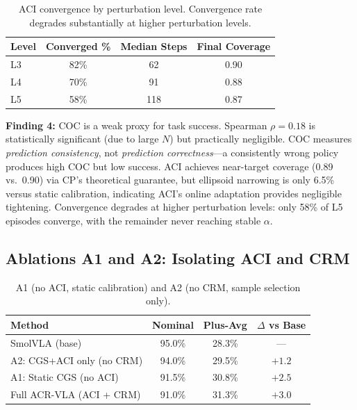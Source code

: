 \documentclass[letterpaper]{article}
\begin{document}
\begin{table}[h]
\centering
\caption{ACI convergence by perturbation level. Convergence rate degrades substantially at higher perturbation levels.}
\label{tab:aci}
\begin{tabular}{lccc}
\toprule
Level & Converged \% & Median Steps & Final Coverage \\
\midrule
L3 & 82\% & 62 & 0.90 \\
L4 & 70\% & 91 & 0.88 \\
L5 & 58\% & 118 & 0.87 \\
\bottomrule
\end{tabular}
\end{table}

\textbf{Finding 4:} COC is a weak proxy for task success. Spearman $\rho = 0.18$ is statistically significant (due to large $N$) but practically negligible. COC measures \emph{prediction consistency}, not \emph{prediction correctness}---a consistently wrong policy produces high COC but low success. ACI achieves near-target coverage (0.89 vs.\ 0.90) via CP's theoretical guarantee, but ellipsoid narrowing is only 6.5\% versus static calibration, indicating ACI's online adaptation provides negligible tightening. Convergence degrades at higher perturbation levels: only 58\% of L5 episodes converge, with the remainder never reaching stable $\alpha$.

\subsection{Ablations A1 and A2: Isolating ACI and CRM}
\label{sec:exp-a1a2}

\begin{table}[h]
\centering
\caption{A1 (no ACI, static calibration) and A2 (no CRM, sample selection only).}
\label{tab:a1a2}
\begin{tabular}{lccc}
\toprule
Method & Nominal & Plus-Avg & $\Delta$ vs Base \\
\midrule
SmolVLA (base) & 95.0\% & 28.3\% & --- \\
A2: CGS+ACI only (no CRM) & 94.0\% & 29.5\% & $+1.2$ \\
A1: Static CGS (no ACI) & 91.5\% & 30.8\% & $+2.5$ \\
Full ACR-VLA (ACI + CRM) & 91.0\% & 31.3\% & $+3.0$ \\
\bottomrule
\end{tabular}
\end{table}
\end{document}
